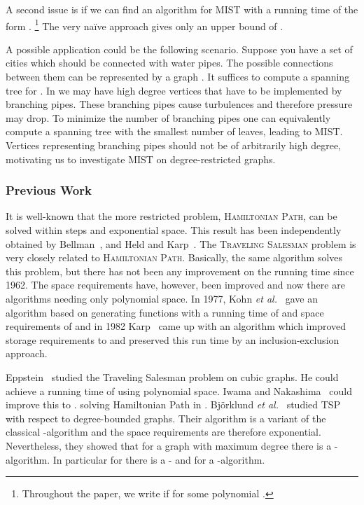\documentclass{llncs}
\newcommand{\longversion}[1]{#1}
\newcommand{\shortversion}[1]{}
\newcommand{\mist}{\textsc{MIST}\xspace}
\begin{document}
A second issue is \longversion{if we can}\shortversion{to} find an algorithm for \mist with a running time of the form .
\footnote{\longversion{Throughout the paper, we write } if 
for some polynomial .}  
The \longversion{very }na{\"i}ve approach gives only an upper bound of .


A possible application could be the following scenario. \longversion{Suppose you have a set of}\shortversion{Consider} cities which should be connected with water pipes. The possible connections between them can be represented by a graph . It suffices to compute a spanning tree  for .  In  we may have high degree vertices that have to be implemented by branching pipes\longversion{. These branching pipes}\shortversion{ which} cause turbulences and therefore pressure may drop. To minimize the number of branching pipes one  can equivalently compute a spanning tree with the smallest number of leaves, leading to \mist. Vertices representing 
 branching pipes should not be of  arbitrarily high degree, motivating us to investigate \mist on degree-restricted graphs.

\subsubsection*{Previous Work}
It is well-known that the more restricted problem, \textsc{Hamiltonian Path}, can be solved within  steps and exponential space. This
result has been  independently obtained by Bellman~\cite{Bel62}, and Held and Karp~\cite{HelKar62}. The \textsc{Traveling Salesman} problem is very
closely related to \textsc{Hamiltonian Path}. Basically, the same algorithm solves this problem, but there has not been any improvement on the running
time since 1962. The space requirements have, however, been improved and now there 
are  algorithms needing only polynomial space. In 1977, Kohn \emph{et al.}~\cite{KohGotKoh77} gave an algorithm based on generating
functions with a running time of  and space requirements of  and in 1982 Karp~\cite{Kar77} came up with an algorithm which
improved storage requirements to  and preserved this run time by an inclusion-exclusion approach.

Eppstein~\cite{Epp03} studied the {\sc Traveling Salesman }problem on cubic graphs. He could achieve a running time of  using
polynomial space. Iwama and Nakashima~\cite{IwaNak07} could improve this to . solving {\sc Hamiltonian Path} in .
Bj{\"o}rklund \emph{et al.}~\cite{BjoHusKasKoi08} studied TSP with respect to degree-bounded graphs. Their algorithm is a variant of the classical
-algorithm and the space requirements are therefore exponential. Nevertheless, they showed that for a graph with maximum degree 
 there is a -algorithm. In particular for  there is a - and for  a -algorithm.
\end{document}
